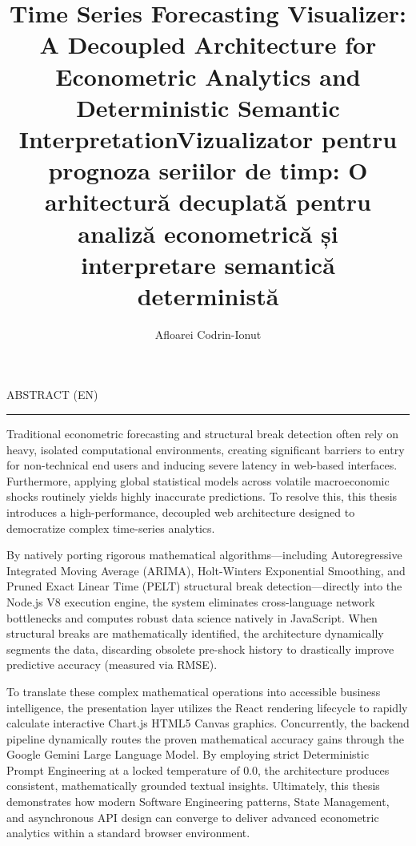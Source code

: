 \documentclass[11pt]{report}
\begin{document}
\title{Time Series Forecasting Visualizer: A Decoupled Architecture for Econometric Analytics and Deterministic Semantic Interpretation}					   
\author{Afloarei Codrin-Ionut}											
				
\maketitle

\title{Vizualizator pentru prognoza seriilor de timp: O arhitectură decuplată pentru analiză econometrică și interpretare semantică deterministă}
\maketitle
{} %

\newpage
\thispagestyle{empty}
\mbox{}
\newpage
{} 

\cleardoublepage
ABSTRACT (EN)
\vspace{0.5cm}	
\hrule
\vspace{0.5cm}	

Traditional econometric forecasting and structural break detection often rely on heavy, isolated computational environments, creating significant barriers to entry for non-technical end users and inducing severe latency in web-based interfaces. Furthermore, applying global statistical models across volatile macroeconomic shocks routinely yields highly inaccurate predictions. To resolve this, this thesis introduces a high-performance, decoupled web architecture designed to democratize complex time-series analytics. 

By natively porting rigorous mathematical algorithms—including Autoregressive Integrated Moving Average (ARIMA), Holt-Winters Exponential Smoothing, and Pruned Exact Linear Time (PELT) structural break detection—directly into the Node.js V8 execution engine, the system eliminates cross-language network bottlenecks and computes robust data science natively in JavaScript. When structural breaks are mathematically identified, the architecture dynamically segments the data, discarding obsolete pre-shock history to drastically improve predictive accuracy (measured via RMSE).

To translate these complex mathematical operations into accessible business intelligence, the presentation layer utilizes the React rendering lifecycle to rapidly calculate interactive Chart.js HTML5 Canvas graphics. Concurrently, the backend pipeline dynamically routes the proven mathematical accuracy gains through the Google Gemini Large Language Model. By employing strict Deterministic Prompt Engineering at a locked temperature of $0.0$, the architecture produces consistent, mathematically grounded textual insights. Ultimately, this thesis demonstrates how modern Software Engineering patterns, State Management, and asynchronous API design can converge to deliver advanced econometric analytics within a standard browser environment.
\end{document}
